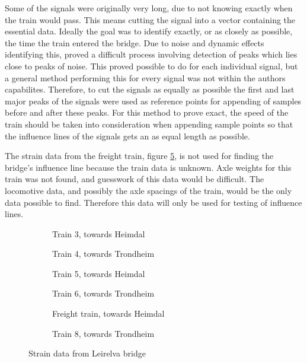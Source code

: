 Some of the signals were originally very long, due to not knowing exactly when the train would pass. This means cutting the signal into a vector containing the essential data. Ideally the goal was to identify exactly, or as closely as possible, the time the train entered the bridge. Due to noise and dynamic effects identifying this, proved a difficult process involving detection of peaks which lies close to peaks of noise. This proved possible to do for each individual signal, but a general method performing this for every signal was not within the authors capabilites. Therefore, to cut the signals as equally as possible the first and last major peaks of the signals were used as reference points for appending of samples before and after these peaks. For this method to prove exact, the speed of the train should be taken into consideration when appending sample points so that the influence lines of the signals gets an as equal length as possible.

The strain data from the freight train, figure \ref{fig:strain_train7}, is not used for finding the bridge's influence line because the train data is unknown. Axle weights for this train was not found, and guesswork of this data would be difficult. The locomotive data, and possibly the axle spacings of the train, would be the only data possible to find. Therefore this data will only be used for testing of influence lines.
\begin{figure}[H]
	\centering
	\begin{subfigure}[t]{0.4\textwidth}
		\centering
		
		\caption{Train 3, towards Heimdal}
		\label{fig:strain_train3}
	\end{subfigure}
	\qquad
	\begin{subfigure}[t]{0.4\textwidth}
		\centering
		
		\caption{Train 4, towards Trondheim}
		\label{fig:strain_train4}
	\end{subfigure}

	\begin{subfigure}[t]{0.4\textwidth}
		\centering
		
		\caption{Train 5, towards Heimdal}
		\label{fig:strain_train5}
	\end{subfigure}
	\qquad
  \begin{subfigure}[t]{0.4\textwidth}
    \centering
    
		\caption{Train 6, towards Trondheim}
    \label{fig:strain_train6}
  \end{subfigure}

  \begin{subfigure}[t]{0.4\textwidth}
    \centering
    
		\caption{Freight train, towards Heimdal}
    \label{fig:strain_train7}
  \end{subfigure}
    \qquad
	\begin{subfigure}[t]{0.4\textwidth}
		\centering
		
		\caption{Train 8, towards Trondheim}
		\label{fig:strain_train8}
	\end{subfigure}
  \caption{Strain data from Leirelva bridge}
  \label{fig:strain_all}
\end{figure}

